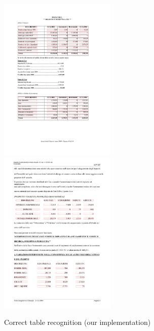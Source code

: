 \begin{figure}[t]
\centering
\includegraphics[width=15em]{img/results/goodRes1.png}
\includegraphics[width=15em]{img/results/goodRes2.png}
\caption{Correct table recognition (our implementation)}
\label{fig:sampleResults}
\end{figure}
